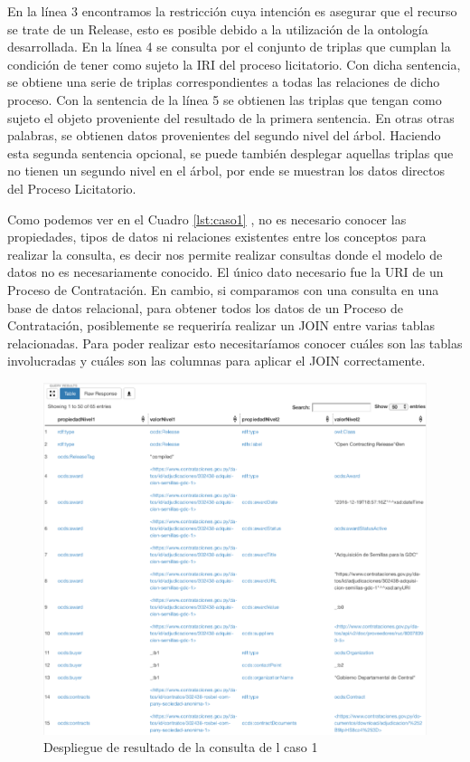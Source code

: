 En la línea 3 encontramos la restricción cuya intención es asegurar que el recurso se trate de un Release, esto es posible debido a la utilización de la ontología desarrollada. En la línea 4 se consulta por el conjunto de triplas que cumplan la condición de tener como sujeto la IRI del proceso licitatorio. Con dicha sentencia, se obtiene una serie de triplas correspondientes a todas las relaciones de dicho proceso. Con la sentencia de la línea 5 se obtienen las triplas que tengan como sujeto el objeto proveniente del resultado de la primera sentencia. En otras otras palabras, se obtienen datos provenientes del segundo nivel del árbol. Haciendo esta segunda sentencia opcional, se puede también desplegar aquellas triplas que no tienen un segundo nivel en el árbol, por ende se muestran los datos directos del Proceso Licitatorio.

Como podemos ver en el Cuadro \ref{lst:caso1} , no es necesario conocer las propiedades, tipos de datos ni relaciones existentes entre los conceptos para realizar la consulta, es decir nos permite realizar consultas donde el modelo de datos no es necesariamente conocido. El único dato necesario fue la URI de un Proceso de Contratación. En cambio, si comparamos con una consulta en una base de datos relacional, para obtener todos los datos de un Proceso de Contratación, posiblemente se requeriría realizar un JOIN entre varias tablas relacionadas. Para poder realizar esto necesitaríamos conocer cuáles son las tablas involucradas y cuáles son las columnas para aplicar el JOIN correctamente.



\begin{figure}[ht!]
    \centering
    \includegraphics[width=150mm]{figuras/caso1Resultado.png}
    \caption{Despliegue de resultado de la consulta de l caso 1}
    \label{img:caso1Resultado}
 \end{figure}
